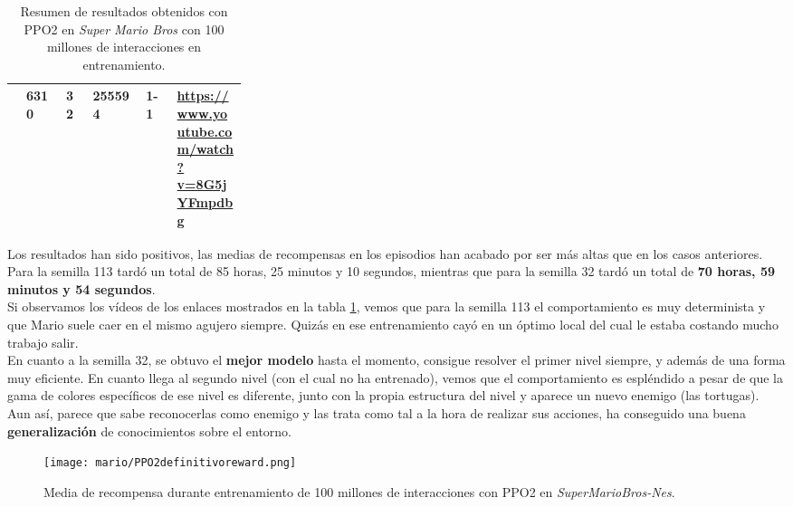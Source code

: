 \documentclass[11pt,fleqn]{book} %
\begin{document}
\begin{table}[H]
\begin{tabular}{l|l|l|l|l|p{0.3\linewidth}|}
		\rowcolor[HTML]{C3D7FA} 
		\multicolumn{1}{|l|}{\multirow{-2}{*}{\cellcolor[HTML]{C7DCB4}\textbf{PPO2}}} & \textbf{6310}                                                                                                     & \textbf{32}                                                                          & \textbf{255594}                                                                                                    & \textbf{1-1}                                                                                                       & \url{https://www.youtube.com/watch?v=8G5jYFmpdbg}                       \\ \hline
	\end{tabular}
	\caption{Resumen de resultados obtenidos con PPO2 en \textit{Super Mario Bros} con 100 millones de interacciones en entrenamiento.}
	\label{table:resultadosMario2}
\end{table}

Los resultados han sido positivos, las medias de recompensas en los episodios han acabado por ser más altas que en los casos anteriores. Para la semilla 113 tardó un total de {85 horas, 25 minutos y 10 segundos}, mientras que para la semilla 32 tardó un total de \textbf{70 horas, 59 minutos y 54 segundos}. \\

Si observamos los vídeos de los enlaces mostrados en la tabla \ref{table:resultadosMario2}, vemos que para la semilla 113 el comportamiento es muy determinista y que Mario suele caer en el mismo agujero siempre. Quizás en ese entrenamiento cayó en un óptimo local del cual le estaba costando mucho trabajo salir. \\

En cuanto a la semilla 32, se obtuvo el \textbf{mejor modelo} hasta el momento, consigue resolver el primer nivel siempre, y además de una forma muy eficiente. En cuanto llega al segundo nivel (con el cual no ha entrenado), vemos que el comportamiento es espléndido a pesar de que la gama de colores específicos de ese nivel es diferente, junto con la propia estructura del nivel y aparece un nuevo enemigo (las tortugas). Aun así, parece que sabe reconocerlas como enemigo y las trata como tal a la hora de realizar sus acciones, ha conseguido una buena \textbf{generalización} de conocimientos sobre el entorno. 

\begin{figure}[H]
	\centering\texttt{[image: mario/PPO2definitivoreward.png]}
	\caption{Media de recompensa durante entrenamiento de 100 millones de interacciones con PPO2 en \textit{SuperMarioBros-Nes}.}
	\label{fig:marioPPO22recompensas} %
\end{figure}
\end{document}
